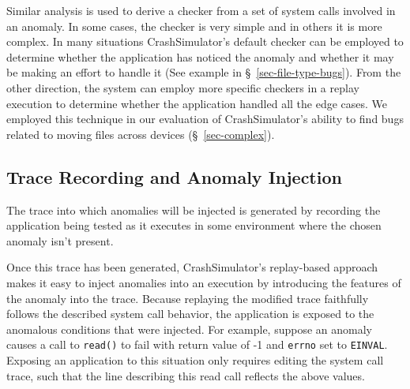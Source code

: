     Similar analysis is used to derive a checker from a set of system calls
    involved in an anomaly.
    In some cases, %
    the checker is very simple and in others it is more complex.
    In many situations
    CrashSimulator's default checker can be employed to determine
    whether the application has noticed the anomaly and whether it may be making
    an effort to handle it (See example in
    \S~\ref{sec-file-type-bugs}).  From the other direction,
    the system can employ more specific checkers in a replay execution 
    to determine whether the application handled
    all the edge cases.  We employed this technique in our
    evaluation of CrashSimulator's ability to find bugs related to moving files across
    devices (\S~\ref{sec-complex}).
    
    \subsection{Trace Recording and Anomaly Injection}

    The trace into which anomalies will be injected is generated by recording
    the application being tested as it executes in some environment where the
    chosen anomaly isn't present.

    Once this trace has been generated,
    CrashSimulator's replay-based approach makes it easy to inject anomalies
    into an execution by introducing the features of the
    anomaly into the trace.
    Because replaying the modified trace faithfully
    follows the described system call behavior, the application is exposed to
    the anomalous conditions that were injected.
    For example, suppose an anomaly causes a
    call to {\tt read()} to fail with return value of -1 and {\tt errno} set to
    {\tt EINVAL}.  Exposing an application to this situation only requires
    editing the system call trace, such that the line describing this read call
    reflects the above values.




